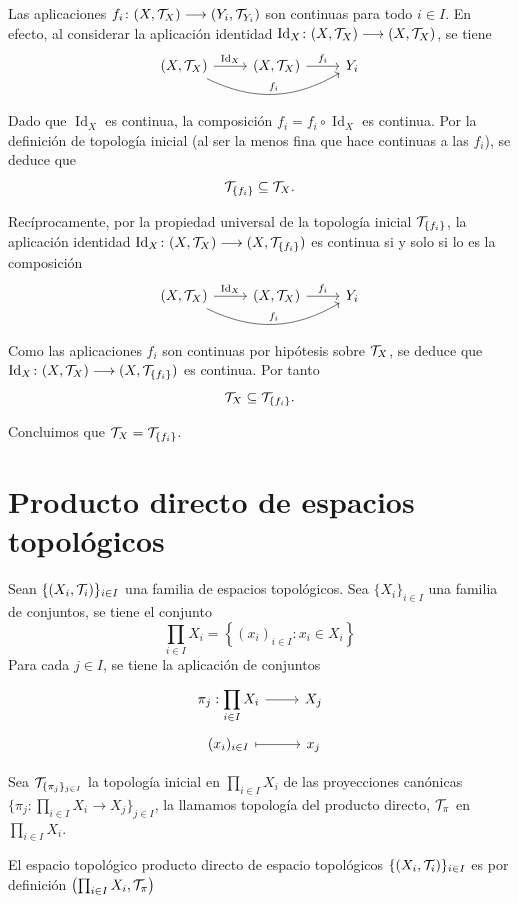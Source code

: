 \begin{dem}
Las aplicaciones $f_i \colon (X, \mathcal{T}_X) \longrightarrow (Y_i, \mathcal{T}_{Y_i})$ son continuas para todo $i \in I$. En efecto, al considerar la aplicación identidad $\operatorname{Id}_X \colon (X, \mathcal{T}_X) \longrightarrow (X, \mathcal{T}_X)$, se tiene 
\[
\bt (X, \mc T_X) \rar{\operatorname{Id}_X} \arrow[bend right=10mm]{rr}{f_i} & (X, \mc T_X) \rar{f_i} & Y_i \et
\]
Dado que $\operatorname{Id}_X$ es continua, la composición $f_i = f_i \circ \operatorname{Id}_X$ es continua. Por la definición de topología inicial (al ser la menos fina que hace continuas a las $f_i$), se deduce que
\[
    \mathcal{T}_{\{f_i\}} \subseteq \mathcal{T}_X.
\]

Recíprocamente, por la propiedad universal de la topología inicial $\mathcal{T}_{\{f_i\}}$, la aplicación identidad $\operatorname{Id}_X \colon (X, \mathcal{T}_X) \longrightarrow (X, \mathcal{T}_{\{f_i\}})$ es continua si y solo si lo es la composición
\[
\bt (X, \mc T_X) \rar{\operatorname{Id}_X} \arrow[bend right=10mm]{rr}{f_i} & (X, \mc T_X) \rar{f_i} & Y_i \et
\]
Como las aplicaciones $f_i$ son continuas por hipótesis sobre $\mathcal{T}_X$, se deduce que $\operatorname{Id}_X \colon (X, \mathcal{T}_X) \longrightarrow (X, \mathcal{T}_{\{f_i\}})$ es continua. Por tanto
\[
    \mathcal{T}_X \subseteq \mathcal{T}_{\{f_i\}}.
\]

Concluimos que $\mathcal{T}_X = \mathcal{T}_{\{f_i\}}$.
\end{dem}

\section{Producto directo de espacios topol\'ogicos}

Sean $\{(X_i,\mathcal{T}_i)\}_{i\in I}$  una familia de espacios topol\'ogicos. Sea $\{X_i\}_{i \in I}$ una familia de conjuntos, se tiene el conjunto
$$\prod_{i\in I} X_i = \left\{ (x_i)_{i\in I} : x_i \in X_i \right\}$$
Para cada $j\in I$, se tiene la aplicaci\'on de conjuntos
$$\bt \pi_j : \displaystyle \prod_{i \in I} X_i \rar & X_j \\[-5mm] (x_i)_{i\in I} \rarmaps & x_j \et$$

Sea $\mathcal{T}_{\{\pi_j\}_{j \in I}}$ la topolog\'ia inicial en $\prod_{i \in I} X_i$ de las proyecciones can\'onicas $\{\pi_j: \prod_{i \in I} X_i \longrightarrow X_j\}_{j \in I}$, la llamamos topolog\'ia del producto directo, $\mathcal{T}_{\pi}$ en $\prod_{i \in I} X_i$.

El espacio topol\'ogico producto directo de espacio topol\'ogicos $\{(X_i, \mathcal{T}_i)\}_{i\in I}$ es por definici\'on $\left(\prod_{i \in I} X_i, \mathcal{T}_{\pi} \right)$

